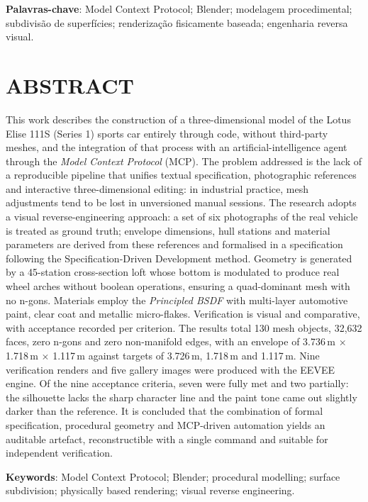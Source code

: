 \vspace{1.0cm}
\noindent\textbf{Palavras-chave}: Model Context Protocol; Blender; modelagem procedimental;
subdivis\~ao de superf\'icies; renderiza\c{c}\~ao fisicamente baseada; engenharia reversa visual.

\clearpage

\chapter*{ABSTRACT}
\thispagestyle{plain}

\SingleSpacing
\noindent
This work describes the construction of a three-dimensional model of the Lotus Elise 111S
(Series 1) sports car entirely through code, without third-party meshes, and the integration of
that process with an artificial-intelligence agent through the \emph{Model Context Protocol}
(MCP). The problem addressed is the lack of a reproducible pipeline that unifies textual
specification, photographic references and interactive three-dimensional editing: in industrial
practice, mesh adjustments tend to be lost in unversioned manual sessions. The research adopts a
visual reverse-engineering approach: a set of six photographs of the real vehicle is treated as
ground truth; envelope dimensions, hull stations and material parameters are derived from these
references and formalised in a specification following the Specification-Driven Development
method. Geometry is generated by a 45-station cross-section loft whose bottom is modulated to
produce real wheel arches without boolean operations, ensuring a quad-dominant mesh with no
n-gons. Materials employ the \emph{Principled BSDF} with multi-layer automotive paint, clear coat
and metallic micro-flakes. Verification is visual and comparative, with acceptance recorded per
criterion. The results total 130 mesh objects, 32,632 faces, zero n-gons and zero non-manifold
edges, with an envelope of 3.736\,m $\times$ 1.718\,m $\times$ 1.117\,m against targets of
3.726\,m, 1.718\,m and 1.117\,m. Nine verification renders and five gallery images were produced
with the EEVEE engine. Of the nine acceptance criteria, seven were fully met and two partially:
the silhouette lacks the sharp character line and the paint tone came out slightly darker than
the reference. It is concluded that the combination of formal specification, procedural geometry
and MCP-driven automation yields an auditable artefact, reconstructible with a single command and
suitable for independent verification.

\vspace{1.0cm}
\noindent\textbf{Keywords}: Model Context Protocol; Blender; procedural modelling; surface
subdivision; physically based rendering; visual reverse engineering.
\OnehalfSpacing
\clearpage
